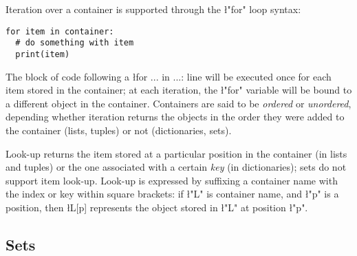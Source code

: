 Iteration over a container is supported through the \l"for" loop
syntax:
\begin{lstlisting}
for item in container:
  # do something with item
  print(item)
\end{lstlisting}
The block of code following a \l{for ... in ...:} line will be
executed once for each item stored in the container; at each
iteration, the \l"for" variable will be bound to a different object in
the container.  Containers are said to be \emph{ordered} or
\emph{unordered}, depending whether iteration returns the objects in
the order they were added to the container (lists, tuples) or not
(dictionaries, sets).

Look-up returns the item stored at a particular position in the
container (in lists and tuples) or the one associated with a certain
\emph{key} (in dictionaries); sets do not support item look-up.  
Look-up is expressed by suffixing a container name with the index or key
within square brackets: if \l"L" is container name, and \l"p" is a
position, then \l{L[p]} represents the object stored in \l"L" at
position \l"p".

\subsection{Sets}
\label{sec:sets}

